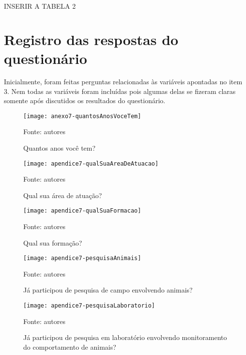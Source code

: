 INSERIR A TABELA 2

\section{Registro das respostas do questionário}

Inicialmente, foram feitas perguntas relacionadas às variáveis apontadas no item 3. Nem todas as variáveis foram incluídas pois algumas delas se fizeram claras somente após discutidos os resultados do questionário.

\begin{figure}[ht]
  \centering
    \caption{Quantos anos você tem?}
    \texttt{[image: anexo7-quantosAnosVoceTem]}
	\centerline{\small{Fonte: autores}}
\end{figure}
\FloatBarrier

\begin{figure}[ht]
  \centering
    \caption{Qual sua área de atuação?}
    \texttt{[image: apendice7-qualSuaAreaDeAtuacao]}
	\centerline{\small{Fonte: autores}}
\end{figure}
\FloatBarrier

\begin{figure}[ht]
  \centering
    \caption{Qual sua formação?}
    \texttt{[image: apendice7-qualSuaFormacao]}
	\centerline{\small{Fonte: autores}}
\end{figure}
\FloatBarrier

\begin{figure}[ht]
  \centering
    \caption{Já participou de pesquisa de campo envolvendo animais?}
    \texttt{[image: apendice7-pesquisaAnimais]}
	\centerline{\small{Fonte: autores}}
\end{figure}
\FloatBarrier

\begin{figure}[ht]
  \centering
    \caption{Já participou de pesquisa em laboratório envolvendo monitoramento do comportamento de animais?}
    \texttt{[image: apendice7-pesquisaLaboratorio]}
	\centerline{\small{Fonte: autores}}
\end{figure}
\FloatBarrier